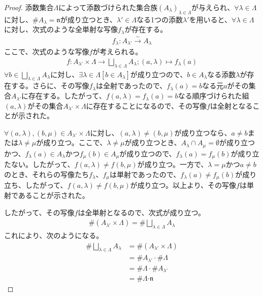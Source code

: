 \documentclass[dvipdfmx]{jsarticle}
\begin{document}
\begin{proof}
添数集合$\varLambda$によって添数づけられた集合族$\left( A_{\lambda} \right)_{\lambda \in \varLambda}$が与えられ、$\forall\lambda \in \varLambda$に対し、$\# A_{\lambda} = \mathfrak{n}$が成り立つとき、$\lambda' \in \varLambda$なる1つの添数$\lambda'$を用いると、$\forall\lambda \in \varLambda$に対し、次式のような全単射な写像$f_{\lambda}$が存在する。
\begin{align*}
f_{\lambda}:A_{\lambda'}\overset{\sim}{\rightarrow}A_{\lambda}
\end{align*}
ここで、次式のような写像$f$が考えられる。
\begin{align*}
f:A_{\lambda'} \times \varLambda \rightarrow \bigsqcup_{\lambda \in \varLambda} A_{\lambda};(a,\lambda) \mapsto f_{\lambda}(a)
\end{align*}
$\forall b \in \bigsqcup_{\lambda \in \varLambda} A_{\lambda}$に対し、$\exists\lambda \in \varLambda\left[ b \in A_{\lambda} \right]$が成り立つので、$b \in A_{\lambda}$なる添数$\lambda$が存在する。さらに、その写像$f_{\lambda}$は全射であったので、$f_{\lambda}(a) = b$なる元$a$がその集合$A_{\lambda'}$に存在する。したがって、$f(a,\lambda) = f_{\lambda}(a) = b$なる順序づけられた組$(a,\lambda)$がその集合$A_{\lambda'} \times \varLambda$に存在することになるので、その写像$f$は全射となることが示された。\par
$\forall(a,\lambda),(b,\mu) \in A_{\lambda'} \times \varLambda$に対し、$(a,\lambda) \neq (b,\mu)$が成り立つなら、$a \neq b$または$\lambda \neq \mu$が成り立つ。ここで、$\lambda \neq \mu$が成り立つとき、$A_{\lambda} \cap A_{\mu} = \emptyset $が成り立つかつ、$f_{\lambda}(a) \in A_{\lambda}$かつ$f_{\mu}(b) \in A_{\mu}$が成り立つので、$f_{\lambda}(a) = f_{\mu}(b)$が成り立たない。したがって、$f(a,\lambda) \neq f(b,\mu)$が成り立つ。一方で、$\lambda = \mu$かつ$a \neq b$のとき、それらの写像たち$f_{\lambda}$、$f_{\mu}$は単射であったので、$f_{\lambda}(a) \neq f_{\mu}(b)$が成り立ち、したがって、$f(a,\lambda) \neq f(b,\mu)$が成り立つ。以上より、その写像$f$は単射であることが示された。\par
したがって、その写像$f$は全単射となるので、次式が成り立つ。
\begin{align*}
\# \left( A_{\lambda'} \times \varLambda \right) = \# {\bigsqcup_{\lambda \in \varLambda} A_{\lambda}}
\end{align*}
これにより、次のようになる。
\begin{align*}
\# {\bigsqcup_{\lambda \in \varLambda} A_{\lambda}} &= \# \left( A_{\lambda'} \times \varLambda \right)\\
&= \# A_{\lambda'} \cdot \# \varLambda\\
&= \# \varLambda \cdot \# A_{\lambda'}\\
&= \# \varLambda\mathfrak{\cdot n}
\end{align*}
\end{proof}
\end{document}
